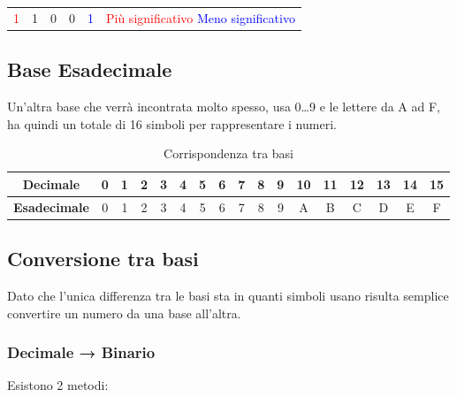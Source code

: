 \documentclass{article}
\begin{document}
\begin{table}[ht]
    \centering
    \begin{tabular}{ccccc|p{30mm}}
        \textcolor{red}{1} & 1 & 0 & 0 & \textcolor{blue}{1} & \textcolor{red}{Più significativo} \newline \textcolor{blue}{Meno significativo}\\
    \end{tabular}
\end{table}

\subsection{Base Esadecimale}

\vspace{1pt}
Un'altra base che verrà incontrata molto spesso, usa 0\ldots9 e le lettere da A ad F, ha quindi un totale di 16 simboli per rappresentare i numeri.

\vspace{4pt}
\begin{table}[ht]
    \centering
    \begin{tabular}{c|c|c|c|c|c|c|c|c|c|c|c|c|c|c|c|c}
       \textbf{Decimale} & 0 & 1 & 2 & 3 & 4 & 5 & 6 & 7 & 8 & 9 & 10 & 11 & 12 & 13 & 14 & 15\\
       \hline
       \rule{0pt}{3ex}\textbf{Esadecimale} & 0 & 1 & 2 & 3 & 4 & 5 & 6 & 7 & 8 & 9 & A & B & C & D & E & F
    \end{tabular}
    \caption{Corrispondenza tra basi}
    \label{tab:dec_hex_corr}
\end{table}

\newpage

\subsection{Conversione tra basi}

Dato che l'unica differenza tra le basi sta in quanti simboli usano risulta semplice convertire un numero da una base all'altra.

    \subsubsection{Decimale → Binario}

    Esistono 2 metodi:
\end{document}
